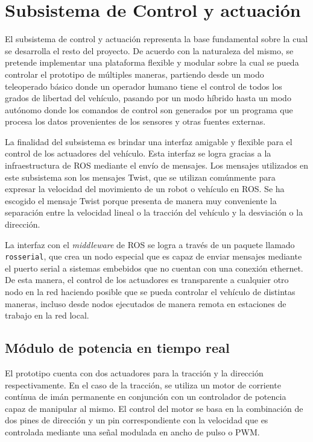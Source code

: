 \section{Subsistema de Control y actuación}\label{sec:control}

El subsistema de control y actuación representa la base fundamental sobre la cual se desarrolla el resto del proyecto. De acuerdo 
con la naturaleza del mismo, se pretende implementar una plataforma flexible y modular sobre la cual se pueda controlar el 
prototipo de múltiples maneras, partiendo desde un modo teleoperado básico donde un operador humano tiene el control 
de todos los grados de libertad del vehículo, pasando por un modo híbrido hasta un modo autónomo donde los comandos de 
control son generados por un programa que procesa los datos provenientes de los sensores y otras fuentes externas.

La finalidad del subsistema es brindar una interfaz amigable y flexible para el control de los actuadores del vehículo. Esta 
interfaz se logra gracias a la infraestructura de ROS mediante el envío de mensajes. Los mensajes utilizados en este subsistema 
son los mensajes Twist, que se utilizan comúnmente para expresar la velocidad del movimiento de un robot o vehículo en ROS. Se ha
escogido el mensaje Twist porque presenta de manera muy conveniente la separación entre la velocidad lineal o 
la tracción del vehículo y la desviación o la dirección. 

La interfaz con el \textit{middleware} de ROS se logra a través de un paquete llamado \lstinline{rosserial}, que crea un nodo especial 
que es capaz de enviar mensajes mediante el puerto serial a sistemas embebidos que no cuentan con una conexión ethernet. De esta 
manera, el control de los actuadores es transparente a cualquier otro nodo en la red haciendo posible que se pueda controlar 
el vehículo de distintas maneras, incluso desde nodos ejecutados de manera remota en estaciones de trabajo en la red local.


    \subsection{Módulo de potencia en tiempo real}
    El prototipo cuenta con dos actuadores para la tracción y la dirección respectivamente. En el caso de la tracción, se 
    utiliza un motor de corriente contínua de imán permanente en conjunción con un controlador de potencia capaz de manipular 
    al mismo. El control del motor se basa en la combinación de dos pines de dirección y un pin correspondiente con la velocidad 
    que es controlada mediante una señal modulada en ancho de pulso o PWM. 

